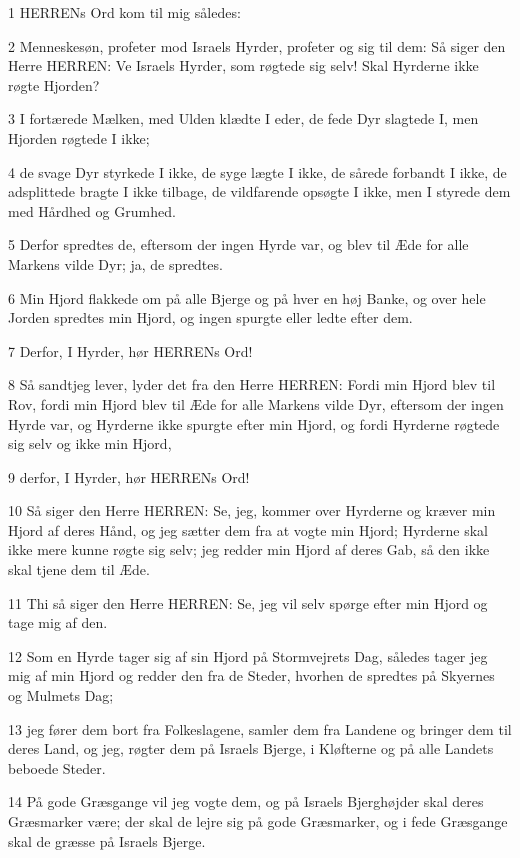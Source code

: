 \par 1 HERRENs Ord kom til mig således:
\par 2 Menneskesøn, profeter mod Israels Hyrder, profeter og sig til dem: Så siger den Herre HERREN: Ve Israels Hyrder, som røgtede sig selv! Skal Hyrderne ikke røgte Hjorden?
\par 3 I fortærede Mælken, med Ulden klædte I eder, de fede Dyr slagtede I, men Hjorden røgtede I ikke;
\par 4 de svage Dyr styrkede I ikke, de syge lægte I ikke, de sårede forbandt I ikke, de adsplittede bragte I ikke tilbage, de vildfarende opsøgte I ikke, men I styrede dem med Hårdhed og Grumhed.
\par 5 Derfor spredtes de, eftersom der ingen Hyrde var, og blev til Æde for alle Markens vilde Dyr; ja, de spredtes.
\par 6 Min Hjord flakkede om på alle Bjerge og på hver en høj Banke, og over hele Jorden spredtes min Hjord, og ingen spurgte eller ledte efter dem.
\par 7 Derfor, I Hyrder, hør HERRENs Ord!
\par 8 Så sandtjeg lever, lyder det fra den Herre HERREN: Fordi min Hjord blev til Rov, fordi min Hjord blev til Æde for alle Markens vilde Dyr, eftersom der ingen Hyrde var, og Hyrderne ikke spurgte efter min Hjord, og fordi Hyrderne røgtede sig selv og ikke min Hjord,
\par 9 derfor, I Hyrder, hør HERRENs Ord!
\par 10 Så siger den Herre HERREN: Se, jeg, kommer over Hyrderne og kræver min Hjord af deres Hånd, og jeg sætter dem fra at vogte min Hjord; Hyrderne skal ikke mere kunne røgte sig selv; jeg redder min Hjord af deres Gab, så den ikke skal tjene dem til Æde.
\par 11 Thi så siger den Herre HERREN: Se, jeg vil selv spørge efter min Hjord og tage mig af den.
\par 12 Som en Hyrde tager sig af sin Hjord på Stormvejrets Dag, således tager jeg mig af min Hjord og redder den fra de Steder, hvorhen de spredtes på Skyernes og Mulmets Dag;
\par 13 jeg fører dem bort fra Folkeslagene, samler dem fra Landene og bringer dem til deres Land, og jeg, røgter dem på Israels Bjerge, i Kløfterne og på alle Landets beboede Steder.
\par 14 På gode Græsgange vil jeg vogte dem, og på Israels Bjerghøjder skal deres Græsmarker være; der skal de lejre sig på gode Græsmarker, og i fede Græsgange skal de græsse på Israels Bjerge.

